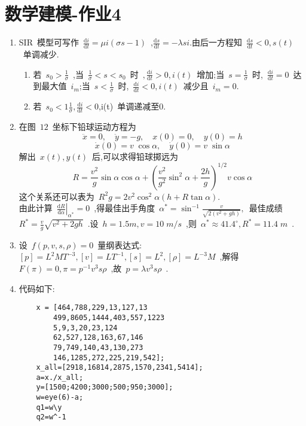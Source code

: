\documentclass{article}
\begin{document}
\section*{数学建模-作业4}
\begin{enumerate}
    \item SIR~模型可写作~$\frac{\mathrm{d}i}{\mathrm{d}t}=\mu i(\sigma s - 1)$~,$\frac{\mathrm{d}s}{\mathrm{d}t}=-\lambda si$.由后一方程知~$\frac{\mathrm{d}s}{\mathrm{d}t}<0,s(t)$~单调减少.
    \begin{enumerate}
        \item 若~$s_0 > \frac{1}{\sigma}$~,当~$\frac{1}{\sigma}<s<s_0$~时~$,\frac{\mathrm{d}i}{\mathrm{d}t}>0,i(t)$~增加;当~$s=\frac{1}{\sigma}$~时,~$\frac{\mathrm{d}i}{\mathrm{d}t}=0$~达到最大值~$i_m$;当~$s<\frac{1}{\sigma}$~时,~$\frac{\mathrm{d}i}{\mathrm{d}t}<0,i(t)$~减少且~$i_m=0$.
        \item 若~$s_0<1\frac{1}{\sigma},\frac{\mathrm{d}i}{\mathrm{d}t}<0$,i(t)~单调递减至0.
    \end{enumerate}
    \item 在图~$12$~坐标下铅球运动方程为
    \begin{equation*}
        \ddot{x}=0,\quad \ddot{y}=-g,\quad x(0)=0,\quad y(0)=h
    \end{equation*}
    \begin{equation*}
        \dot{x}(0)=v\;\cos{\alpha},\quad \dot{y}(0)=v\;\sin{\alpha}
    \end{equation*}
    解出~$x(t),y(t)$~后,可以求得铅球掷远为
    \begin{equation*}
        R= \frac{v^2}{g} \sin{\alpha} \cos{\alpha} + \left( \frac{v^2}{g^2} \sin^2{\alpha} + \frac{2h}{g} \right)^{1/2} v\cos{\alpha}
    \end{equation*}
    这个关系还可以表为~$R^2g=2v^2 \cos^2{\alpha}(h+R \tan{\alpha})$.\\
    由此计算~$\left.\frac{\mathrm{d}R}{\mathrm{d}\alpha} \right|_{\alpha^{*}}=0$~,得最佳出手角度~$\alpha^{*}=\sin^{-1}{\frac{v}{\sqrt{2(v^2+gh)}}},$~最佳成绩~$R^{*}=\frac{v}{g}\sqrt{v^2+2gh}$~.设~$h=1.5m,v=10\;m/s$~,则~$\alpha^{*}\approx 41.4^{\circ},R^{*}=11.4\;m$~.
    
    \item 设~$f(p,v,s,\rho)=0$~量纲表达式:~$[p]=L^2MT^{-3},[v]=LT^{-1},[s]=L^{2},[\rho]=L^{-3}M$~,解得~$F(\pi)=0,\pi = p^{-1}v^{3}s\rho$~,故~$p=\lambda v^3 s \rho$~.
    \newpage
    \item 代码如下:
    \begin{lstlisting}
    x = [464,788,229,13,127,13
        499,8605,1444,403,557,1223
        5,9,3,20,23,124
        62,527,128,163,67,146
        79,749,140,43,130,273
        146,1285,272,225,219,542];
    x_all=[2918,16814,2875,1570,2341,5414];
    a=x./x_all;
    y=[1500;4200;3000;500;950;3000];
    w=eye(6)-a;
    q1=w\y
    q2=w^-1

    \end{lstlisting}
\end{enumerate}
\end{document}
